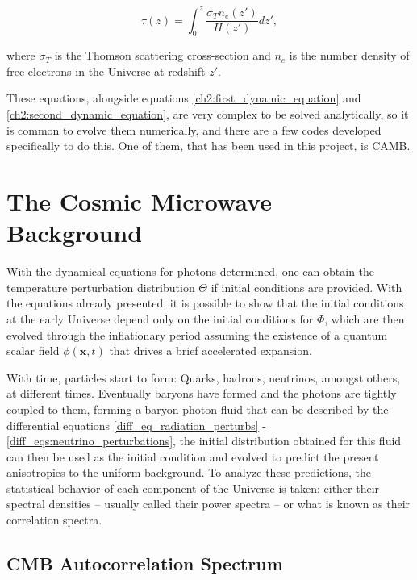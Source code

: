 \documentclass[openany,a4paper,12pt,oneside]{book}
\begin{document}
\begin{spacing}{1.5}
\begin{equation}\label{def:optical_depth}
	\tau(z)=\int_0^z \frac{\sigma_T n_e(z')}{H(z')} dz',
\end{equation}

\noindent where $\sigma_T$ is the Thomson scattering cross-section and $n_e$ is the number density of free electrons in the Universe at redshift $z'$.

These equations, alongside equations \eqref{ch2:first_dynamic_equation} and \eqref{ch2:second_dynamic_equation}, are very complex to be solved analytically, so it is common to evolve them numerically, and there are a few codes developed specifically to do this. One of them, that has been used in this project, is CAMB.\cite{CAMB:Lewis1999bs, CAMB:Lewis2002ah}

\section{The Cosmic Microwave Background}

With the dynamical equations for photons determined, one can obtain the temperature perturbation distribution $\Theta$ if initial conditions are provided. With the equations already presented, it is possible to show that the initial conditions at the early Universe depend only on the initial conditions for $\Phi$\cite{dodelson2020modern}, which are then evolved through the inflationary period assuming the existence of a quantum scalar field $\phi(\mathbf{x}, t)$ that drives a brief accelerated expansion. 

With time, particles start to form: Quarks, hadrons, neutrinos, amongst others, at different times. Eventually baryons have formed and the photons are tightly coupled to them, forming a baryon-photon fluid that can be described by the differential equations \eqref{diff_eq_radiation_perturbs} - \eqref{diff_eqs:neutrino_perturbations}, the initial distribution obtained for this fluid can then be used as the initial condition and evolved to predict the present anisotropies to the uniform background. To analyze these predictions, the statistical behavior of each component of the Universe is taken: either their spectral densities -- usually called their power spectra -- or what is known as their correlation spectra. 

\subsection{CMB Autocorrelation Spectrum}


\end{spacing}
\end{document}
